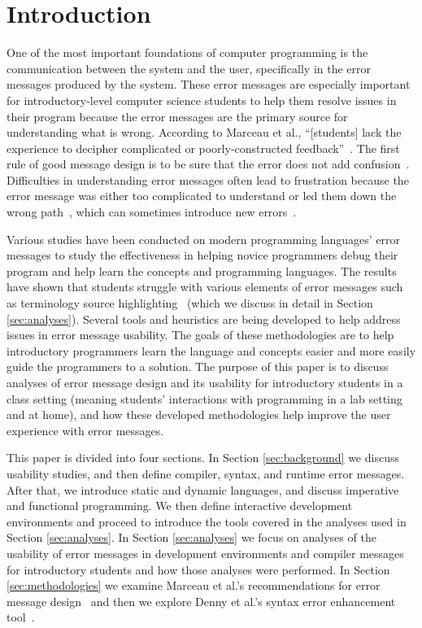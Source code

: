 \documentclass{sig-alternate}
\begin{document}


\section{Introduction}\label{sec:intro}
One of the most important foundations of computer programming is the communication between the system and the user, specifically in the error messages produced by the system.
These error messages are especially important for introductory-level computer science students to help them resolve issues in their program because the error messages are the primary source for understanding what is wrong.
According to Marceau et al., ``[students] lack the experience to decipher complicated or poorly-constructed feedback''~\cite{Marceau:2011:MEE:1953163.1953308}.
The first rule of good message design is to be sure that the error does not add confusion~\cite{Isa:1983:MOE:800045.801583}.
Difficulties in understanding error messages often lead to frustration because the error message was either too complicated to understand or led them down the wrong path~\cite{Marceau:2011:MYL:2048237.2048241}, which can sometimes introduce new errors~\cite{Denny:2014:ESE:2591708.2591748}.

Various studies have been conducted on modern programming languages' error messages to study the effectiveness in helping novice programmers debug their program and help learn the concepts and programming languages.
The results have shown that students struggle with various elements of error messages such as terminology source highlighting~\cite{Denny:2014:ESE:2591708.2591748,Traver:2010} (which we discuss in detail in Section \ref{sec:analyses}).
Several tools and heuristics are being developed to help address issues in error message usability.
The goals of these methodologies are to help introductory programmers learn the language and concepts easier and more easily guide the programmers to a solution.
The purpose of this paper is to discuss analyses of error message design and its usability for introductory students in a class setting (meaning students' interactions with programming in a lab setting and at home), and how these developed methodologies help improve the user experience with error messages. 

This paper is divided into four sections.
In Section \ref{sec:background} we discuss usability studies, and then define compiler, syntax, and runtime error messages. After that, we introduce static and dynamic languages, and discuss imperative and functional programming. We then define interactive development environments and proceed to introduce the tools covered in the analyses used in Section \ref{sec:analyses}.
In Section \ref{sec:analyses} we focus on analyses of the usability of error messages in development environments and compiler messages for introductory students and how those analyses were performed.
In Section \ref{sec:methodologies} we examine Marceau et al.'s recommendations for error message design~\cite{Marceau:2011:MYL:2048237.2048241} and then we explore Denny et al.'s syntax error enhancement tool~\cite{Denny:2014:ESE:2591708.2591748}.
\end{document}

